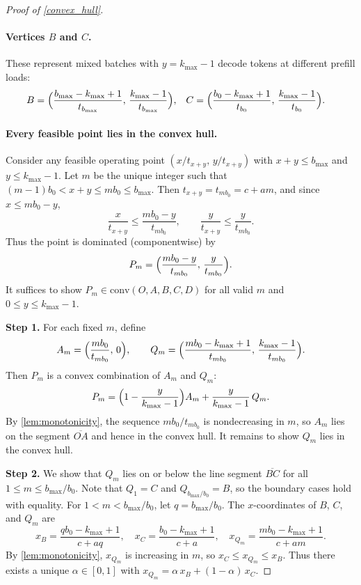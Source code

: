 \documentclass[10pt,a4paper]{amsart}
\begin{document}
\begin{proof}[Proof of \cref{convex_hull}]
\paragraph{Vertices $B$ and $C$.} These represent mixed batches with \( y = k_{\max} - 1 \) decode tokens at different prefill loads:
\begin{align*}
    B &= \Bigl(\frac{b_{\max} - k_{\max} + 1}{t_{b_{\max}}},\, \frac{k_{\max} - 1}{t_{b_{\max}}}\Bigr), &
    C &= \Bigl(\frac{b_0 - k_{\max} + 1}{t_{b_0}},\, \frac{k_{\max} - 1}{t_{b_0}}\Bigr).
\end{align*}

\paragraph{Every feasible point lies in the convex hull.}
Consider any feasible operating point \( (x/t_{x+y},\, y/t_{x+y}) \) with \( x + y \le b_{\max} \) and \( y \le k_{\max} - 1 \). Let \( m \) be the unique integer such that \( (m-1)b_0 < x + y \le m b_0 \le b_{\max} \). Then \( t_{x+y} = t_{m b_0} = c + am \), and since \( x \le m b_0 - y \),
\[
\frac{x}{t_{x+y}} \le \frac{m b_0 - y}{t_{m b_0}}, \qquad \frac{y}{t_{x+y}} \le \frac{y}{t_{m b_0}}.
\]
Thus the point is dominated (componentwise) by
\[
P_m = \Bigl( \frac{m b_0 - y}{t_{m b_0}},\, \frac{y}{t_{m b_0}} \Bigr).
\]
It suffices to show \( P_m \in \mathrm{conv}(O, A, B, C, D) \) for all valid \( m \) and \( 0 \le y \le k_{\max} - 1 \).

\textbf{Step 1.} For each fixed \( m \), define
\[
A_m = \Bigl( \frac{m b_0}{t_{m b_0}},\, 0 \Bigr), \qquad Q_m = \Bigl( \frac{m b_0 - k_{\max} + 1}{t_{m b_0}},\, \frac{k_{\max} - 1}{t_{m b_0}} \Bigr).
\]
Then \( P_m \) is a convex combination of \( A_m \) and \( Q_m \):
\[
P_m = \Bigl(1 - \frac{y}{k_{\max} - 1}\Bigr) A_m + \frac{y}{k_{\max} - 1}\, Q_m.
\]
By \cref{lem:monotonicity}, the sequence \( m b_0 / t_{m b_0} \) is nondecreasing in \( m \), so \( A_m \) lies on the segment \( \overline{OA} \) and hence in the convex hull. It remains to show \( Q_m \) lies in the convex hull.

\textbf{Step 2.} We show that \( Q_m \) lies on or below the line segment \( \overline{BC} \) for all \( 1 \le m \le b_{\max}/b_0 \). Note that \( Q_1 = C \) and \( Q_{b_{\max}/b_0} = B \), so the boundary cases hold with equality. For \( 1 < m < b_{\max}/b_0 \), let \( q = b_{\max}/b_0 \). The \( x \)-coordinates of \( B \), \( C \), and \( Q_m \) are
\[
x_B = \frac{q b_0 - k_{\max} + 1}{c + aq}, \quad x_C = \frac{b_0 - k_{\max} + 1}{c + a}, \quad x_{Q_m} = \frac{m b_0 - k_{\max} + 1}{c + am}.
\]
By \cref{lem:monotonicity}, \( x_{Q_m} \) is increasing in \( m \), so \( x_C \le x_{Q_m} \le x_B \). Thus there exists a unique \( \alpha \in [0,1] \) with \( x_{Q_m} = \alpha\, x_B + (1 - \alpha)\, x_C \).


\end{proof}
\end{document}

